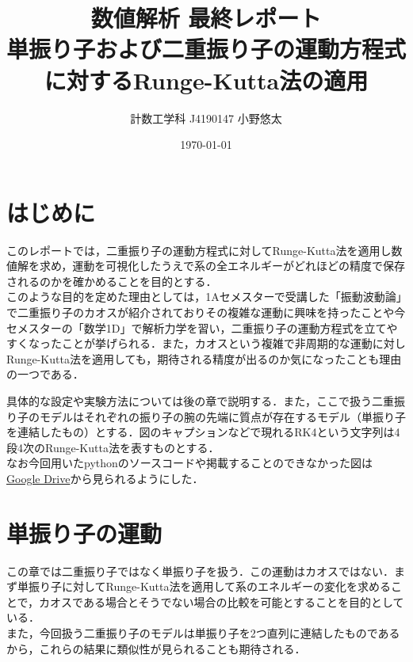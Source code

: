 \documentclass[a4paper,11pt]{jsarticle}
\begin{document}
\title{数値解析 最終レポート\\ \large 単振り子および二重振り子の運動方程式に対するRunge-Kutta法の適用}
\author{計数工学科 J4190147 小野悠太}
\date{\today}
\maketitle
\newpage
\setcounter{tocdepth}{3}
\tableofcontents
\newpage

\section{はじめに}
このレポートでは，二重振り子の運動方程式に対してRunge-Kutta法を適用し数値解を求め，運動を可視化したうえで系の全エネルギーがどれほどの精度で保存されるのかを確かめることを目的とする．\\
このような目的を定めた理由としては，1Aセメスターで受講した「振動波動論」で二重振り子のカオスが紹介されておりその複雑な運動に興味を持ったことや今セメスターの「数学1D」で解析力学を習い，二重振り子の運動方程式を立てやすくなったことが挙げられる．また，カオスという複雑で非周期的な運動に対しRunge-Kutta法を適用しても，期待される精度が出るのか気になったことも理由の一つである．\par
具体的な設定や実験方法については後の章で説明する．また，ここで扱う二重振り子のモデルはそれぞれの振り子の腕の先端に質点が存在するモデル（単振り子を連結したもの）とする．図のキャプションなどで現れるRK4という文字列は4段4次のRunge-Kutta法を表すものとする．\\
なお今回用いたpythonのソースコードや掲載することのできなかった図は\href{https://drive.google.com/drive/folders/1-kBPHq-9sE60zyVfORrB6y43cNVRGf_P?usp=sharing}{Google Drive}から見られるようにした．


\newpage

\section{単振り子の運動}
この章では二重振り子ではなく単振り子を扱う．この運動はカオスではない．まず単振り子に対してRunge-Kutta法を適用して系のエネルギーの変化を求めることで，カオスである場合とそうでない場合の比較を可能とすることを目的としている．\\
また，今回扱う二重振り子のモデルは単振り子を2つ直列に連結したものであるから，これらの結果に類似性が見られることも期待される．
\end{document}
